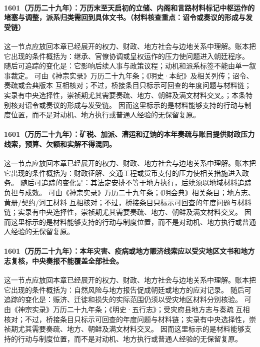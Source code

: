 \paragraph{1601（万历二十九年）：万历末至天启初的立储、内阁和言路材料标记中枢运作的堵塞与调整，派系归类需回到具体文书。（材料核查重点：诏令或奏议的形成与发受链）} 这一节点应放回本章已经展开的权力、财政、地方社会与边地关系中理解。账本把它出现的条件概括为：继承、官僚协调或皇权运作的压力使问题进入朝廷程序。 随后可追踪的变化是：它影响后续人事与政策议程；动机和派系标签不能由单一叙事裁定。 可由《神宗实录》万历二十九年条；《明史·本纪》及相关列传；诏令、奏疏或会典版本 互相核对；不过，桥接条目只标示可回查的年度问题与材料链；实录有中央选择性，崇祯期尤其需要奏疏、地方、朝鲜及满文材料交叉。；本条特别核对诏令或奏议的形成与发受链。 因而这里标示的是材料能够支持的行动与制度位置，而不是对动机、地方执行或普通人经验的无保留复原。

\paragraph{1601（万历二十九年）：矿税、加派、漕运和辽饷的本年奏疏与账目提供财政压力线索，预算、欠额和实解不得混同。} 这一节点应放回本章已经展开的权力、财政、地方社会与边地关系中理解。账本把它出现的条件概括为：财政征解、交通工程或货币支付的压力使相关措施进入政务。 随后可追踪的变化是：其法定安排不等于地方执行，后续须以地域材料追踪负担与成效。 可由《神宗实录》万历二十九年条；《明会典》相关条目；地方志、黄册/契约/河工材料 互相核对；不过，桥接条目只标示可回查的年度问题与材料链；实录有中央选择性，崇祯期尤其需要奏疏、地方、朝鲜及满文材料交叉。 因而这里标示的是材料能够支持的行动与制度位置，而不是对动机、地方执行或普通人经验的无保留复原。

\paragraph{1601（万历二十九年）：本年灾害、疫病或地方赈济线索应以受灾地区文书和地方志复核，中央奏报不能覆盖全部社会。} 这一节点应放回本章已经展开的权力、财政、地方社会与边地关系中理解。账本把它出现的条件概括为：自然风险与地方报告促成朝廷或地方的应对记录。 随后可追踪的变化是：赈济、迁徙和损失的实际范围仍须以受灾地区材料分别核验。 可由《神宗实录》万历二十九年条；《明史·五行志》；受灾府县地方志与奏疏 互相核对；不过，桥接条目只标示可回查的年度问题与材料链；实录有中央选择性，崇祯期尤其需要奏疏、地方、朝鲜及满文材料交叉。 因而这里标示的是材料能够支持的行动与制度位置，而不是对动机、地方执行或普通人经验的无保留复原。

